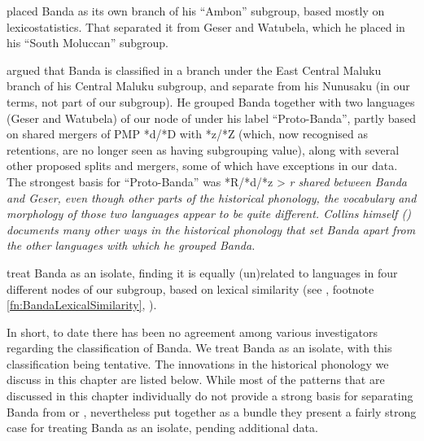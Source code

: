 \citet{Chlenov1976} placed Banda as its own branch of his “Ambon”
subgroup, based mostly on lexicostatistics.
That separated it from Geser
and Watubela, which he placed in his “South Moluccan” subgroup.

\citet{Collins1986} argued that Banda is classified in a branch
under the East Central Maluku branch of his Central Maluku subgroup,
and separate from his Nunusaku (in our terms,
not part of our  subgroup).
He grouped Banda together with two languages (Geser
and Watubela) of our  node of 
under his label “Proto-Banda”,
partly based on shared mergers of PMP *d/*D with *z/*Z (which,
now recognised as retentions,
are no longer seen as having subgrouping value),
along with several other proposed splits
and mergers, some of which have exceptions in our data.
The strongest basis for “Proto-Banda” was *R/*d/*z > \it{r} shared
between Banda and Geser, even though other parts of the historical phonology,
the vocabulary and morphology of those two languages appear to be quite different.
Collins himself (\citeyear{Collins1986}) documents many other ways in the
historical phonology that set Banda apart from the other  languages with which he grouped Banda.

\citet[112]{LoskiLoski1989} treat Banda as an isolate,
finding it is equally (un)related to languages in four different
nodes of our  subgroup,
based on lexical similarity
(see , footnote \ref{fn:BandaLexicalSimilarity},
).

In short, to date there has been no agreement among various investigators
regarding the classification of Banda.
We treat Banda as an isolate,
with this classification being tentative.
The innovations in the historical phonology we discuss in this
chapter are listed below.
While most of the patterns that are discussed in this chapter
individually do not provide a strong basis for separating Banda
from  or ,
nevertheless put together as a bundle they present a fairly strong
case for treating Banda as an isolate, pending additional data.

